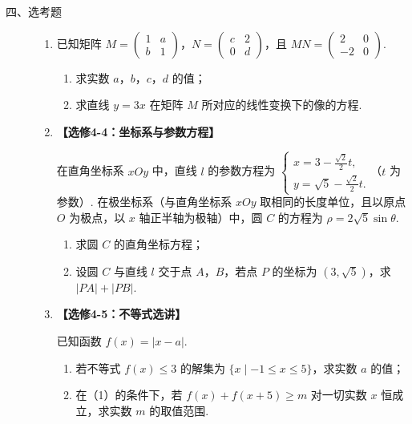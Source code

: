 \begin{description}

    \item[四、选考题]

    \begin{enumerate}[leftmargin=5pt]

      \addtocounter{enumi}{+20}

        \item 已知矩阵 \(M = \begin{pmatrix}1 & a\\ b & 1 \end{pmatrix}\)，\(N = \begin{pmatrix}c & 2\\ 0 & d \end{pmatrix}\)，且 \(MN = \begin{pmatrix}2 & 0\\ -2 & 0 \end{pmatrix}\).
\begin{enumerate}
\item 求实数 \(a\)，\(b\)，\(c\)，\(d\) 的值；
\item 求直线 \(y = 3x\) 在矩阵 \(M\) 所对应的线性变换下的像的方程.
\end{enumerate}

        \item \textbf{【选修4-4：坐标系与参数方程】}

在直角坐标系 \(xOy\) 中，直线 \(l\) 的参数方程为 \(\begin{cases}
x = 3 - \frac{\sqrt{2}}{2} t,\\
y = \sqrt{5} - \frac{\sqrt{2}}{2} t.
\end{cases}\)（\(t\) 为参数）. 在极坐标系（与直角坐标系 \(xOy\) 取相同的长度单位，且以原点 \(O\) 为极点，以 \(x\) 轴正半轴为极轴）中，圆 \(C\) 的方程为 \(\rho = 2\sqrt{5}\sin \theta\).
\begin{enumerate}
\item 求圆 \(C\) 的直角坐标方程；
\item 设圆 \(C\) 与直线 \(l\) 交于点 \(A\)，\(B\)，若点 \(P\) 的坐标为 \((3, \sqrt{5})\)，求 \(|PA| + |PB|\).
\end{enumerate}

        \item \textbf{【选修4-5：不等式选讲】}

已知函数 \(f(x) = |x - a|\).
\begin{enumerate}
\item 若不等式 \(f(x) \leqslant 3\) 的解集为 \(\{x \mid -1 \leqslant x \leqslant 5\}\)，求实数 \(a\) 的值；
\item 在（1）的条件下，若 \(f(x) + f(x + 5) \geqslant m\) 对一切实数 \(x\) 恒成立，求实数 \(m\) 的取值范围.
\end{enumerate}

    \end{enumerate}

\end{description}


